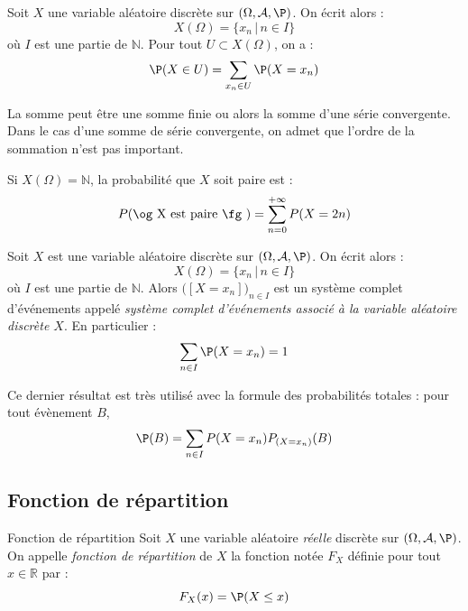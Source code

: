 \documentclass[french,11pt,twoside]{VcCours}
\begin{document}
\begin{Proposition}{} Soit $X$ une variable aléatoire discrète sur $(\Omega, \mathcal{A}, \P)$. On écrit alors :
$$ X(\Omega)= \lbrace x_n \, \vert \, n \in I \rbrace$$
où $I$ est une partie de $\mathbb{N}$. Pour tout $U \subset X(\Omega)$, on a :
$$ \P(X \in U) = \sum_{x_n \in U} \P(X=x_n)$$
\end{Proposition}

\begin{Remarque}{} La somme peut être une somme finie ou alors la somme d'une série convergente. Dans le cas d'une somme de série convergente, on admet que l'ordre de la sommation n'est pas important.
\end{Remarque}

\begin{Demonstration}{} 

\vspace*{3cm}
\end{Demonstration}

\begin{Exemple}{} Si $X(\Omega) = \mathbb{N}$, la probabilité que $X$ soit paire est :
$$ P(\hbox{\og X est paire \fg }) = \sum_{n=0}^{+ \infty} P(X=2n)$$
\end{Exemple}

\begin{Corollaire}{} Soit $X$ est une variable aléatoire discrète sur $(\Omega, \mathcal{A}, \P)$.  On écrit alors :
$$ X(\Omega)= \lbrace x_n \, \vert \, n \in I \rbrace$$
où $I$ est une partie de $\mathbb{N}$. Alors $\big([X=x_n]\big)_{n \in I}$  est un système complet d'événements appelé \emph{système complet d'événements associé à la variable aléatoire discrète $X$}. En particulier :
$$\sum_{n \in I} \P(X=x_n) = 1$$
\end{Corollaire}

Ce dernier résultat est très utilisé avec la formule des probabilités totales : pour tout évènement $B$,
$$ \P(B) = \sum_{n \in I} P(X=x_n) P_{(X=x_n)}(B)$$

\subsection{Fonction de répartition}


\begin{Definition}{Fonction de répartition}
Soit $X$ une variable aléatoire \emph{réelle} discrète sur $(\Omega, \mathcal{A}, \P)$. On appelle \emph{fonction de répartition} de $X$ la fonction notée $F_X$ définie pour tout $x \in \mathbb{R}$ par :
$$F_X(x) = \P(X \leq x) $$
\end{Definition}
\end{document}
